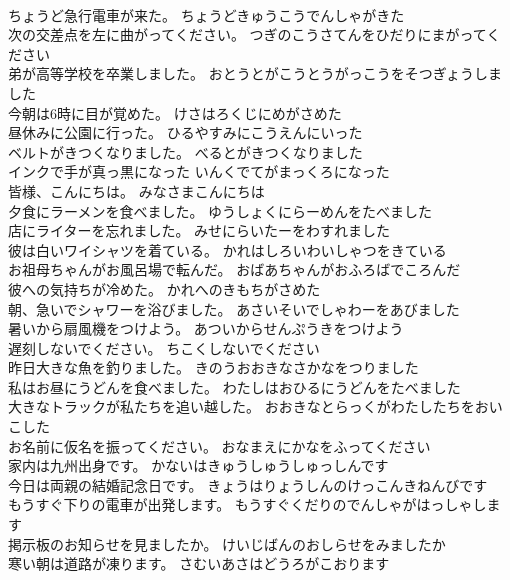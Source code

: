 \documentclass[8pt]{extreport}
\begin{document}
\begin{CJK}{UTF8}{min}
\\	ちょうど急行電車が来た。	ちょうどきゅうこうでんしゃがきた 
\\	次の交差点を左に曲がってください。	つぎのこうさてんをひだりにまがってください 
\\	弟が高等学校を卒業しました。	おとうとがこうとうがっこうをそつぎょうしました 
\\	今朝は6時に目が覚めた。	けさはろくじにめがさめた 
\\	昼休みに公園に行った。	ひるやすみにこうえんにいった 
\\	ベルトがきつくなりました。	べるとがきつくなりました 
\\	インクで手が真っ黒になった	いんくでてがまっくろになった 
\\	皆様、こんにちは。	みなさまこんにちは 
\\	夕食にラーメンを食べました。	ゆうしょくにらーめんをたべました 
\\	店にライターを忘れました。	みせにらいたーをわすれました 
\\	彼は白いワイシャツを着ている。	かれはしろいわいしゃつをきている 
\\	お祖母ちゃんがお風呂場で転んだ。	おばあちゃんがおふろばでころんだ 
\\	彼への気持ちが冷めた。	かれへのきもちがさめた 
\\	朝、急いでシャワーを浴びました。	あさいそいでしゃわーをあびました 
\\	暑いから扇風機をつけよう。	あついからせんぷうきをつけよう 
\\	遅刻しないでください。	ちこくしないでください 
\\	昨日大きな魚を釣りました。	きのうおおきなさかなをつりました 
\\	私はお昼にうどんを食べました。	わたしはおひるにうどんをたべました 
\\	大きなトラックが私たちを追い越した。	おおきなとらっくがわたしたちをおいこした 
\\	お名前に仮名を振ってください。	おなまえにかなをふってください 
\\	家内は九州出身です。	かないはきゅうしゅうしゅっしんです 
\\	今日は両親の結婚記念日です。	きょうはりょうしんのけっこんきねんびです 
\\	もうすぐ下りの電車が出発します。	もうすぐくだりのでんしゃがはっしゃします 
\\	掲示板のお知らせを見ましたか。	けいじばんのおしらせをみましたか 
\\	寒い朝は道路が凍ります。	さむいあさはどうろがこおります 

\end{CJK}
\end{document}
